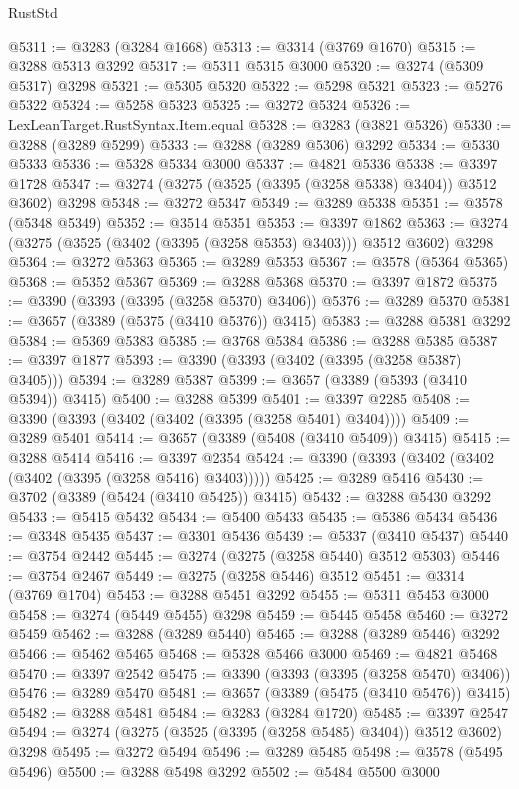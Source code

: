 \begin{lexlean}{RustStd}
\begin{coremodule}
@5311 := @3283 (@3284 @1668)
@5313 := @3314 (@3769 @1670)
@5315 := @3288 @5313 @3292
@5317 := @5311 @5315 @3000
@5320 := @3274 (@5309 @5317) @3298
@5321 := @5305 @5320
@5322 := @5298 @5321
@5323 := @5276 @5322
@5324 := @5258 @5323
@5325 := @3272 @5324
@5326 := LexLeanTarget.RustSyntax.Item.equal
@5328 := @3283 (@3821 @5326)
@5330 := @3288 (@3289 @5299)
@5333 := @3288 (@3289 @5306) @3292
@5334 := @5330 @5333
@5336 := @5328 @5334 @3000
@5337 := @4821 @5336
@5338 := @3397 @1728
@5347 := @3274 (@3275 (@3525 (@3395 (@3258 @5338) @3404)) @3512 @3602) @3298
@5348 := @3272 @5347
@5349 := @3289 @5338
@5351 := @3578 (@5348 @5349)
@5352 := @3514 @5351
@5353 := @3397 @1862
@5363 := @3274 (@3275 (@3525 (@3402 (@3395 (@3258 @5353) @3403))) @3512 @3602) @3298
@5364 := @3272 @5363
@5365 := @3289 @5353
@5367 := @3578 (@5364 @5365)
@5368 := @5352 @5367
@5369 := @3288 @5368
@5370 := @3397 @1872
@5375 := @3390 (@3393 (@3395 (@3258 @5370) @3406))
@5376 := @3289 @5370
@5381 := @3657 (@3389 (@5375 (@3410 @5376)) @3415)
@5383 := @3288 @5381 @3292
@5384 := @5369 @5383
@5385 := @3768 @5384
@5386 := @3288 @5385
@5387 := @3397 @1877
@5393 := @3390 (@3393 (@3402 (@3395 (@3258 @5387) @3405)))
@5394 := @3289 @5387
@5399 := @3657 (@3389 (@5393 (@3410 @5394)) @3415)
@5400 := @3288 @5399
@5401 := @3397 @2285
@5408 := @3390 (@3393 (@3402 (@3402 (@3395 (@3258 @5401) @3404))))
@5409 := @3289 @5401
@5414 := @3657 (@3389 (@5408 (@3410 @5409)) @3415)
@5415 := @3288 @5414
@5416 := @3397 @2354
@5424 := @3390 (@3393 (@3402 (@3402 (@3402 (@3395 (@3258 @5416) @3403)))))
@5425 := @3289 @5416
@5430 := @3702 (@3389 (@5424 (@3410 @5425)) @3415)
@5432 := @3288 @5430 @3292
@5433 := @5415 @5432
@5434 := @5400 @5433
@5435 := @5386 @5434
@5436 := @3348 @5435
@5437 := @3301 @5436
@5439 := @5337 (@3410 @5437)
@5440 := @3754 @2442
@5445 := @3274 (@3275 (@3258 @5440) @3512 @5303)
@5446 := @3754 @2467
@5449 := @3275 (@3258 @5446) @3512
@5451 := @3314 (@3769 @1704)
@5453 := @3288 @5451 @3292
@5455 := @5311 @5453 @3000
@5458 := @3274 (@5449 @5455) @3298
@5459 := @5445 @5458
@5460 := @3272 @5459
@5462 := @3288 (@3289 @5440)
@5465 := @3288 (@3289 @5446) @3292
@5466 := @5462 @5465
@5468 := @5328 @5466 @3000
@5469 := @4821 @5468
@5470 := @3397 @2542
@5475 := @3390 (@3393 (@3395 (@3258 @5470) @3406))
@5476 := @3289 @5470
@5481 := @3657 (@3389 (@5475 (@3410 @5476)) @3415)
@5482 := @3288 @5481
@5484 := @3283 (@3284 @1720)
@5485 := @3397 @2547
@5494 := @3274 (@3275 (@3525 (@3395 (@3258 @5485) @3404)) @3512 @3602) @3298
@5495 := @3272 @5494
@5496 := @3289 @5485
@5498 := @3578 (@5495 @5496)
@5500 := @3288 @5498 @3292
@5502 := @5484 @5500 @3000

\end{coremodule}
\end{lexlean}
